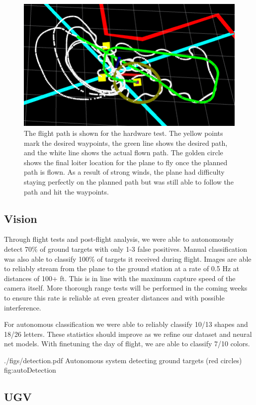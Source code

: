 \documentclass[]{auvsi_doc}
\begin{document}
\begin{figure}
    \centering
    \includegraphics[width=.75\textwidth]{WaypointTest.png}
    \caption{The flight path is shown for the hardware test. The yellow points mark the desired waypoints, the green line shows the desired path, and the white line shows the actual flown path. The golden circle shows the final loiter location for the plane to fly once the planned path is flown. As a result of strong winds, the plane had difficulty staying perfectly on the planned path but was still able to follow the path and hit the waypoints.}
    \label{fig:flight}
\end{figure}

\subsection{Vision}

Through flight tests and post-flight analysis, we were able to autonomously detect 70\% 
of ground targets with only 1-3 false positives. Manual classification was also able to 
classify 100\% of targets it received during flight. Images are able to reliably stream 
from the plane to the ground station at a rate of 0.5 Hz at distances of 100+ ft. This
is in line with the maximum capture speed of the camera itself. More thorough range 
tests will be performed in the coming weeks to ensure this rate is reliable at even
greater distances and with possible interference.

For autonomous classification we were able to reliably classify 10/13 shapes and 18/26 letters. These statistics should improve as we refine our dataset and neural net models. With finetuning the day of flight, we are able to classify 7/10 colors.

\AUVSIFigure
{./figs/detection.pdf}
{\textwidth}
{Autonomous system detecting ground targets (red circles)}
{fig:autoDetection}

\subsection{UGV}
\end{document}
